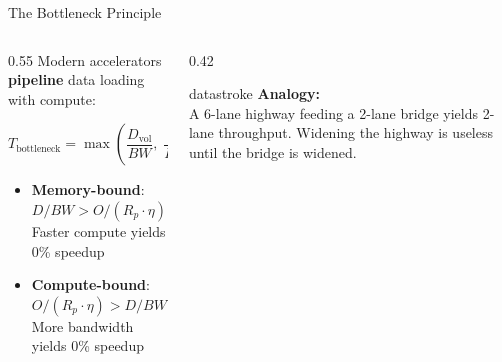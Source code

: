 \documentclass[aspectratio=169, 12pt]{beamer}
\begin{document}
\begin{frame}{The Bottleneck Principle}
\note{
%
%
%
%
}

\footnotesize
\begin{columns}[T]
  \begin{column}{0.55\textwidth}
    Modern accelerators \textbf{pipeline} data loading with compute:

    \vspace{0.1cm}
    $$T_{\text{bottleneck}} = \max\!\left(\frac{D_{\text{vol}}}{BW},\; \frac{O}{R_p \cdot \eta}\right) + L_{\text{lat}}$$

    \vspace{0.1cm}
    \begin{itemize}\setlength\itemsep{1pt}
      \item \textbf{Memory-bound}: $D/BW > O/(R_p \cdot \eta)$\\
        Faster compute yields \alert{0\% speedup}
      \item \textbf{Compute-bound}: $O/(R_p \cdot \eta) > D/BW$\\
        More bandwidth yields 0\% speedup
    \end{itemize}

    \vspace{0.05cm}
  \end{column}
  \begin{column}{0.42\textwidth}
    \vspace{0.2cm}
    \begin{mlsyscard}{datastroke}
    \textbf{Analogy:}\\[0.05cm]
    A 6-lane highway feeding a 2-lane bridge yields 2-lane throughput. Widening the highway is useless until the bridge is widened.
    \end{mlsyscard}
  \end{column}
\end{columns}


\end{frame}
\end{document}

